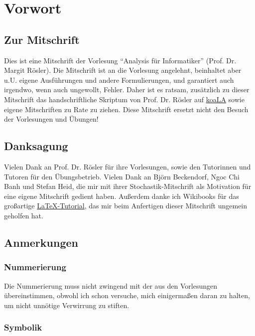 \fancyhead[R]{}
\chapter{Vorwort}
\section{Zur Mitschrift}\label{0.1}
Dies ist eine Mitschrift der Vorlesung ``Analysis für Informatiker'' (Prof. Dr. Margit Rösler).\nl
Die Mitschrift ist an die Vorlesung angelehnt, beinhaltet aber u.U. eigene Ausführungen und andere Formulierungen, und garantiert auch irgendwo, wenn auch ungewollt, Fehler.\nl
Daher ist es ratsam, zusätzlich zu dieser Mitschrift das handschriftliche Skriptum von Prof. Dr. Rösler auf \href{https://koala.uni-paderborn.de/desktop/explorer/4027186}{koaLA} sowie eigene Mitschriften zu Rate zu ziehen.\nl
Diese Mitschrift ersetzt nicht den Besuch der Vorlesungen und Übungen!

\section{Danksagung}\label{0.2}
Vielen Dank an Prof. Dr. Rösler für ihre Vorlesungen, sowie den Tutorinnen und Tutoren für den Übungsbetrieb.\nl
Vielen Dank an Björn Beckendorf, Ngoc Chi Banh und Stefan Heid, die mir mit ihrer Stochastik-Mitschrift als Motivation für eine eigene Mitschrift gedient haben.\nl
Außerdem danke ich Wikibooks für das großartige \href{https://en.wikibooks.org/wiki/LaTeX}{\LaTeX-Tutorial}, das mir beim Anfertigen dieser Mitschrift ungemein geholfen hat.

\section{Anmerkungen}\label{0.3}
\subsection*{Nummerierung}
Die Nummerierung muss nicht zwingend mit der aus den Vorlesungen übereinstimmen, obwohl ich schon versuche, mich einigermaßen daran zu halten, um nicht unnötige Verwirrung zu stiften.

\subsection*{Symbolik}

